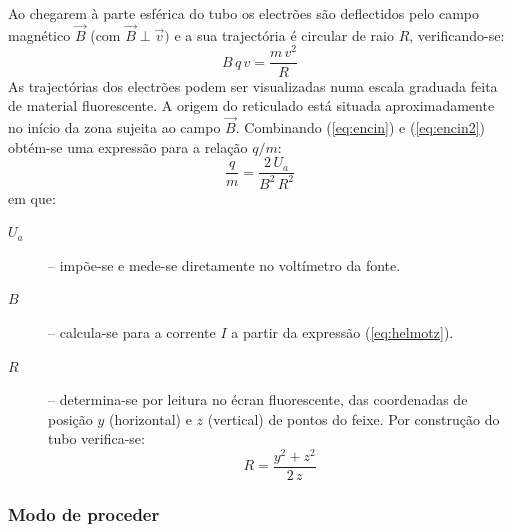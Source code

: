 \documentclass[a4paper,twoside,12pt]{article}      %
\begin{document}
Ao chegarem à parte esférica do tubo os electrões são deflectidos pelo campo magnético $\vec{B}$ (com $\vec{B}\perp\vec{v})$ e a sua trajectória é circular de raio $R$, verificando-se:
\begin{equation}
	\label{eq:encin2}
B \, q\, v = \frac{m\,v^2}{R} 
\end{equation}
As trajectórias dos electrões podem ser visualizadas numa escala graduada feita de material fluorescente. 
A origem do reticulado está situada aproximadamente no início da zona 
sujeita ao campo $\vec{B}$.
Combinando (\ref{eq:encin}) e (\ref{eq:encin2}) obtém-se uma expressão para a relação $q/m$:
\begin{equation}
	\label{eq:encin3}
 \frac{q}{m} = \frac{2\, U_a}{B^2\,R^2} 
\end{equation}
em que:
\begin{description}
\item[$U_a$] – impõe-se e mede-se diretamente no voltímetro da fonte.
\item[$B$] – calcula-se para a corrente $I$ a partir da expressão (\ref{eq:helmotz}).
\item[$R$] – determina-se por leitura no écran fluorescente, das coordenadas de posição $y$ (horizontal) e $z$ (vertical) de pontos do feixe. Por construção do tubo verifica-se:
\begin{equation}
	\label{eq:eR}
 R = \frac{y^2 + z^2}{2 \, z} 
\end{equation}
\end{description}



\subsubsection{\sf Modo de proceder}
\end{document}
